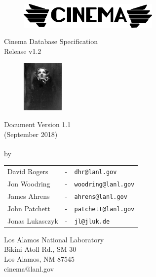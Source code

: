 \thispagestyle{empty}

\begin{ttfamily}
\begin{center}
 \ \ \\
\vspace{1.0 in}
\begin{figure}[h!]
\centering
\includegraphics[height=0.5in]{img/cinema_logo_name}
\end{figure}
\vspace{1.0 in}
Cinema Database Specification \\
\dietrich Release v1.2\\
\bigskip
\begin{figure}[h!]
\centering
\includegraphics[height=1.0in]{img/dietrich_spec_logo}
\end{figure}
\bigskip
Document Version 1.1 \\
(September 2018)\\
\LAUR\\
\bigskip
\bigskip
\bigskip
\bigskip
by \\
\bigskip
\begin{tabular}{lcl}
David Rogers & - & \texttt{\small dhr@lanl.gov}\\
Jon Woodring & - & \texttt{\small woodring@lanl.gov}\\
James Ahrens & - & \texttt{\small ahrens@lanl.gov}\\
John Patchett & - & \texttt{\small patchett@lanl.gov}\\
Jonas Lukasczyk & - & \texttt{\small jl@jluk.de}
\end{tabular}
\end{center}
\vspace{1.0 in}
\begin{flushright}
Los Alamos National Laboratory\\
Bikini Atoll Rd., SM 30\\
Los Alamos, NM 87545\\
cinema@lanl.gov\\
\end{flushright}
\end{ttfamily}
\newpage

\tableofcontents
\newpage

